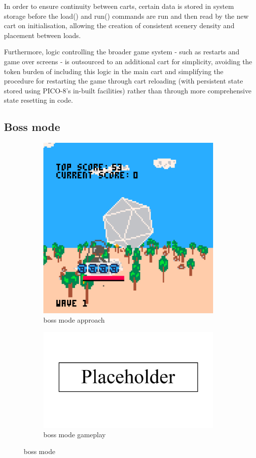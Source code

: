 \documentclass[11pt]{article}
\begin{document}
In order to ensure continuity between carts, certain data is stored in system storage before
the load() and run() commands are run and then read by the new cart on initialisation, allowing
the creation of consistent scenery density and placement between loads.

Furthermore, logic controlling the broader game system - such as restarts and game over screens -
is outsourced to an additional cart for simplicity, avoiding the token burden of including this
logic in the main cart and simplifying the procedure for restarting the game through cart reloading
(with persistent state stored using PICO-8's in-built facilities) rather than through more
comprehensive state resetting in code.

\subsection{Boss mode}\label{boss}

\begin{figure}[h]
\begin{subfigure}{.5\textwidth}
  \centering
  \includegraphics[width=.8\linewidth]{boss1}
  \caption{boss mode approach}
  \label{fig:bossfig1}
\end{subfigure}\hfill
\begin{subfigure}{.5\textwidth}
  \centering
  \includegraphics[width=.8\linewidth]{placeholder}
  \caption{boss mode gameplay}
  \label{fig:bossfig2}
\end{subfigure}\hfill
\caption{boss mode}
\label{fig:boss}
\end{figure}
\end{document}
